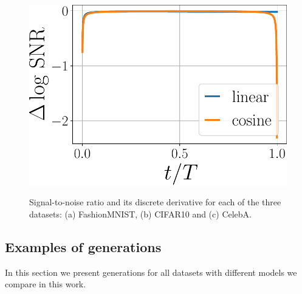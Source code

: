 \begin{figure}[ht]
{    \quad \quad
    \includegraphics[width=0.34\linewidth]{pics/4_daed/snr/CelebA_delta_snr.pdf}}  
	\caption{Signal-to-noise ratio and its discrete derivative for each of the three datasets: (a) FashionMNIST, (b) CIFAR10 and (c) CelebA.}
	\label{fig:snr_per_dataset} 
\vspace*{\baselineskip}
\end{figure}

\clearpage
\newpage
\subsection{Examples of generations}\label{appx:generation}

In this section we present generations for all datasets with different models we compare in this work.


